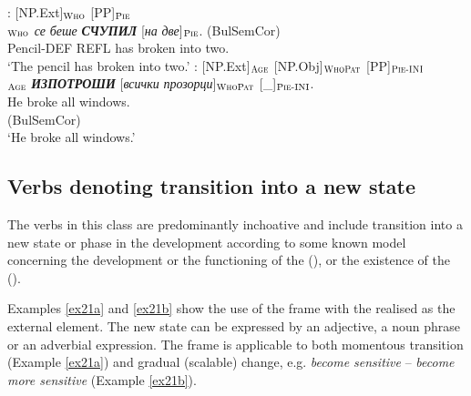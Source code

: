 \documentclass[output=paper,colorlinks,citecolor=brown]{langscibook}
\begin{document}
 \begin{exe}
 \ex \label{ex20}
 \begin{xlist}
\ex \label{ex20a} : [NP.Ext]$_{\text{\textsc{Who}}}$  [PP]$_{\text{\textsc{Pie}}}$\\
$_{\text{\textsc{Who}}}$ \textit{се} \textit{беше} \textit{\textbf{СЧУПИЛ}} [\textit{на} \textit{две}]$_{\text{\textsc{Pie}}}$.  (BulSemCor)\\
Pencil-DEF REFL has broken into two. {}\\
\glt `The pencil has broken into two.'
\ex \label{ex20b}  : [NP.Ext]$_{\text{\textsc{Age}}}$ [NP.Obj]$_{\text{\textsc{WhoPat}}}$ [PP]$_{\text{\textsc{Pie-INI}}}$  \\
$_{\text{\textsc{Age}}}$ \textit{\textbf{ИЗПОТРОШИ}} [\textit{всички} \textit{прозорци}]$_{\text{\textsc{WhoPat}}}$ [\_]$_{\text{\textsc{Pie-INI}}}$.  \\
He broke all windows. {} {}\\ 
(BulSemCor) \\
\glt `He broke all windows.'
 \end{xlist}
 \end{exe}

\subsection{Verbs denoting transition into a new state}\label{sec:transition}

The verbs in this class are predominantly inchoative and include transition into a new state or phase in the development according to some known model concerning the development or the functioning of the  (), or the existence of the  ().

Examples \ref{ex21a} and  \ref{ex21b} show the use of the frame  with the  realised as the external element. The new state can be expressed by an adjective, a noun phrase or an adverbial expression. The frame is applicable to both momentous transition  (Example \ref{ex21a}) and gradual (scalable) change, e.g. \textit{become sensitive} -- \textit{become more sensitive} (Example \ref{ex21b}).
\end{document}
